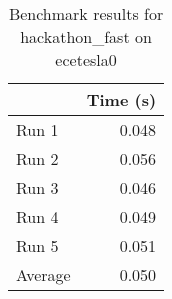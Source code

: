 \documentclass[12pt]{article}
\begin{document}
\begin{table}[H]
  \centering
  \begin{tabular}{lr}
    & {\bf Time (s)} \\
    \hline
    Run 1 & 0.048 \\
    Run 2 & 0.056 \\
    Run 3 & 0.046 \\
    Run 4 & 0.049 \\
    Run 5 & 0.051 \\
    \hline
    Average & 0.050 \\
  \end{tabular}
  \caption{Benchmark results for hackathon\_fast on ecetesla0}
  \label{tbl-hacakthonfast}
\end{table}
\end{document}
